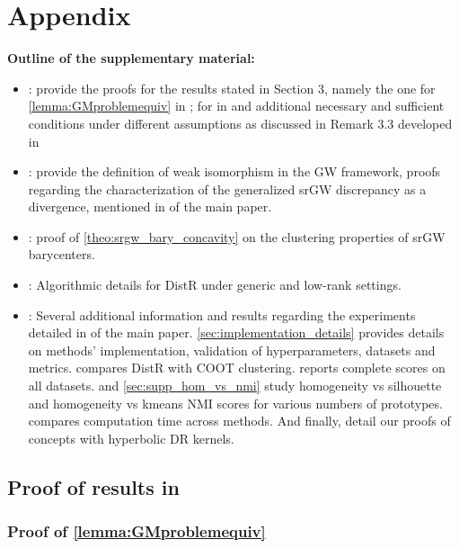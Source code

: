 \section{Appendix}

\textbf{Outline of the supplementary material:}
\begin{itemize}
	\item {}: provide the proofs for the results stated in Section 3, namely the one for \cref{lemma:GMproblemequiv} in ; for  in   and additional necessary and sufficient conditions under different assumptions as discussed in Remark 3.3 developed in 
	\item {}: provide the definition of weak isomorphism in the GW framework, proofs regarding the characterization of the generalized srGW discrepancy as a divergence, mentioned in  of the main paper.
	\item {}: proof of \cref{theo:srgw_bary_concavity} on the clustering properties of srGW barycenters.
	\item {}: Algorithmic details for DistR under generic and low-rank settings.
	\item {}: Several additional information and results regarding the experiments detailed in  of the main paper. \ref{sec:implementation_details} provides details on methods' implementation, validation of hyperparameters, datasets and metrics.  compares DistR with COOT clustering.  reports complete scores on all datasets.  and \ref{sec:supp_hom_vs_nmi} study homogeneity vs silhouette and homogeneity vs kmeans NMI scores for various numbers of prototypes.  compares computation time across methods. And finally,  detail our proofs of concepts with hyperbolic DR kernels.

\end{itemize}

\subsection{Proof of results in }\label{sec:DR_as_OT_supp}

\subsubsection{Proof of \cref{lemma:GMproblemequiv} \label{proof:GMproblemequiv}}

